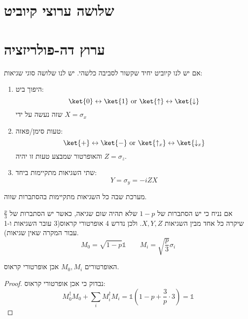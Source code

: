 \documentclass{tstextbook}
\begin{document}
\section{שלושה ערוצי קיוביט}

\section{ערוץ דה-פולריזציה}

\begin{definition}
אם יש לנו קיוביט יחיד שקשור לסביבה כלשהי. יש לנו שלושה סוגי שגיאות:

  \begin{enumerate}
    \item היפוך ביט: 
$$\ket{0} \leftrightarrow  \ket{1}  \text{ or } \ket{\uparrow } \leftrightarrow  \ket{ \downarrow }  $$
שזה נעשה על ידי \(X=\sigma_{x}\)


    \item טעות סימן/פאזה: 
$$\ket{+} \leftrightarrow  \ket{-} \text{ or } \ket{\uparrow _{x}} \leftrightarrow  \ket{\downarrow _{x}} $$
והאופרטור שמבצע טעות זו יהיה \(Z=\sigma_{z}\).


    \item שתי השגיאות מתקיימות ביחד: 
$$Y=\sigma _{y}=-iZX$$


  \end{enumerate}
\end{definition}
\begin{definition}
מערכת שבה כל השגיאות מתקיימות בהסתברות שווה.

\end{definition}
\begin{proposition}
אם נניח כי יש הסתברות של \(1-p\) שלא תהיה שום שגיאה, כאשר יש הסתברות של \(\frac{p}{3}\) שיקרה כל אחד מבין השגיאות \(X,Y,Z\). ולכן נדרש 4 אופרטורי קראוס(3 עובר השגיאות ו-1 עבור המקרה שאין שגיאות).
$$M_{0}=\sqrt{ 1-p }\mathbb{1}  \qquad M_{i}=\sqrt{ \frac{p}{3} } \sigma_{i}
$$

\end{proposition}
\begin{proposition}
האופרטורים \(M_{0},M_{i}\) אכן אופרטורי קראוס.

\end{proposition}
\begin{proof}
נבדוק כי אכן אופרטורי קראוס:
$$M_{0}^{\dagger}M_{0}+\sum_{i}M_{i}^{\dagger} M_{i} = \mathbb{1} \left( 1-p+\frac{3}{p}\cdot 3 \right)=\mathbb{1} $$

\end{proof}
\end{document}
